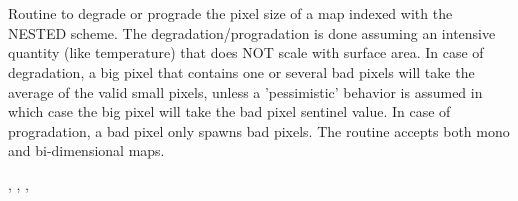 
\sloppy


 \section[udgrade\_nest*]{ }
\label{sub:udgrade_nest}
\author{Eric Hivon}


\begin{facility}
{Routine to degrade or prograde the pixel size of a \healpix map indexed with
  the NESTED scheme. The degradation/progradation is done assuming an
intensive quantity (like temperature) that does NOT scale with surface area. \newline
In case of degradation, a big pixel that contains one or several bad pixels will
take the average of the valid small pixels, unless a 'pessimistic' behavior
is assumed in which case the big pixel will take the bad pixel sentinel value.
In case of progradation, a bad pixel only spawns bad pixels. \newline
The routine accepts both mono and bi-dimensional maps.
}
{\modUdgradeNr}
\end{facility}

\begin{f90format}
{%
, %
, %
, %
 }
\end{f90format}
\aboutoptional

